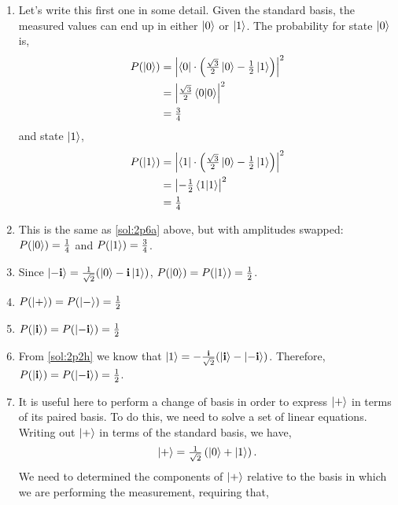 \begin{enumerate}[label=\alph*.,ref={Sol.~\thesection\alph*}]
\label{sol:2p6}
    \item \label{sol:2p6a} Let's write this first one in some detail.
    Given the standard basis, the measured values can end up in either $\ket{0}$ or $\ket{1}$.
    The probability for state $\ket{0}$ is,
    \begin{align*}
        P(\ket{0}) &= \left | \bra{0} \cdot \left ( \tfrac{\sqrt{3}}{2} \ket{0} - \tfrac{1}{2} \ket{1} \right ) \right |^2 \\
        &= \left | \tfrac{\sqrt{3}}{2} \braket{0} \right |^2 \\
        &= \tfrac{3}{4}
    \end{align*}
    and state $\ket{1}$,
    \begin{align*}
        P(\ket{1}) &= \left | \bra{1} \cdot \left ( \tfrac{\sqrt{3}}{2} \ket{0} - \tfrac{1}{2} \ket{1} \right ) \right |^2 \\
        &= \left | -\tfrac{1}{2} \braket{1} \right |^2 \\
        &= \tfrac{1}{4}
    \end{align*}
    \item This is the same as \ref{sol:2p6a} above, but with amplitudes swapped:
    $P(\ket{0}) = \tfrac{1}{4}$ and $P(\ket{1}) = \tfrac{3}{4}$.
    \item Since $\ket{-\mathbf{i}} = \tfrac{1}{\sqrt{2}} (\ket{0} - \mathbf{i} \ket{1})$, $P(\ket{0}) = P(\ket{1}) = \tfrac{1}{2}$.
    \item $P(\ket{+}) = P(\ket{-}) = \tfrac{1}{2}$
    \item $P(\ket{\mathbf{i}}) = P(\ket{-\mathbf{i}}) = \tfrac{1}{2}$
    \item From \ref{sol:2p2h} we know that $\ket{1} = -\tfrac{\mathbf{i}}{\sqrt{2}} (\ket{\mathbf{i}} - \ket{-\mathbf{i}})$.
    Therefore, $P(\ket{\mathbf{i}}) = P(\ket{-\mathbf{i}}) = \tfrac{1}{2}$.
    \item It is useful here to perform a change of basis in order to express $\ket{+}$ in terms of its paired basis.
    To do this, we need to solve a set of linear equations.
    Writing out $\ket{+}$ in terms of the standard basis, we have,
    \begin{align*}
        \ket{+} = \tfrac{1}{\sqrt{2}} \left ( \ket{0} + \ket{1} \right ).
    \end{align*}
    We need to determined the components of $\ket{+}$ relative to the basis in which we are performing the measurement, requiring that,
    \begin{align*}

\end{align*}
\end{enumerate}
